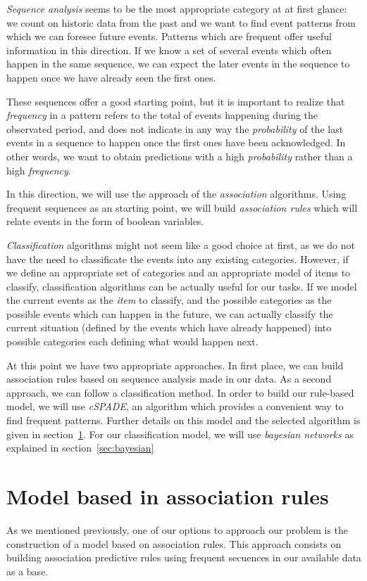 \documentclass[a4paper,12pt]{article}
\begin{document}
\emph{Sequence analysis} seems to be the most appropriate category at at first glance: we count on historic data from the past and we want to find event patterns from which we can foresee future events. Patterns which are frequent offer useful information in this direction. If we know a set of several events which often happen in the same sequence, we can expect the later events in the sequence to happen once we have already seen the first ones.

These sequences offer a good starting point, but it is important to realize that \emph{frequency} in a pattern refers to the total of events happening during the observated period, and does not indicate in any way the \emph{probability} of the last events in a sequence to happen once the first ones have been acknowledged. In other words, we want to obtain predictions with a high \emph{probability} rather than a high \emph{frequency}.

In this direction, we will use the approach of the \emph{association} algorithms. Using frequent sequences as an starting point, we will build \emph{association rules} which will relate events in the form of boolean variables.

\emph{Classification} algorithms might not seem like a good choice at first, as we do not have the need to classificate the events into any existing categories. However, if we define an appropriate set of categories and an appropriate model of items to classify, classification algorithms can be actually useful for our tasks. If we model the current events as the \emph{item} to classify, and the possible categories as the possible events which can happen in the future, we can actually classify the current situation (defined by the events which have already happened) into possible categories each defining what would happen next.

At this point we have two appropriate approaches. In first place, we can build association rules based on sequence analysis made in our data. As a second approach, we can follow a classification method. In order to build our rule-based model, we will use \emph{cSPADE}, an algorithm which provides a convenient way to find frequent patterns. Further details on this model and the selected algorithm is given in section~\ref{sec:rule_model}. For our classification model, we will use \emph{bayesian networks} as explained in section~\ref{sec:bayesian}

\section{Model based in association rules}
\label{sec:rule_model}
As we mentioned previously, one of our options to approach our problem is the construction of a model based on association rules. This approach consists on building association predictive rules using frequent secuences in our available data as a base.
\end{document}

